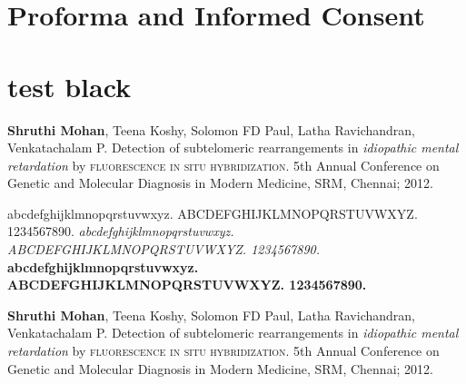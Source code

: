 \noindent%
\begin{minipage}{\linewidth}%
\end{minipage}


\chapter{Proforma and Informed Consent}

\noindent%
\begin{minipage}{\linewidth}%
\end{minipage}
\clearpage

\noindent%
\begin{minipage}{\linewidth}%
\end{minipage}
\clearpage

\noindent%
\begin{minipage}{\linewidth}%
\end{minipage}

\chapter*{test black}

\color{black}
\textbf{Shruthi Mohan}, Teena Koshy, Solomon FD Paul, Latha Ravichandran,
Venkatachalam P. Detection of subtelomeric rearrangements in \textit{idiopathic
  mental retardation} by \textsc{fluorescence in situ hybridization}. 5th Annual
Conference on Genetic and Molecular Diagnosis in Modern Medicine, SRM, Chennai;
2012.

abcdefghijklmnopqrstuvwxyz. ABCDEFGHIJKLMNOPQRSTUVWXYZ. 1234567890.
\textit{abcdefghijklmnopqrstuvwxyz. ABCDEFGHIJKLMNOPQRSTUVWXYZ. 1234567890.}
\textbf{abcdefghijklmnopqrstuvwxyz. ABCDEFGHIJKLMNOPQRSTUVWXYZ. 1234567890.}

\color{CoolBlack}
\textbf{Shruthi Mohan}, Teena Koshy, Solomon FD Paul, Latha Ravichandran,
Venkatachalam P. Detection of subtelomeric rearrangements in \textit{idiopathic
  mental retardation} by \textsc{fluorescence in situ hybridization}. 5th Annual
Conference on Genetic and Molecular Diagnosis in Modern Medicine, SRM, Chennai;
2012.

